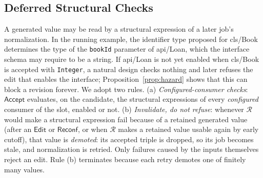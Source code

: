 \documentclass[pdflatex,sn-mathphys-num]{sn-jnl}
\theoremstyle{thmstyleone}%
\theoremstyle{thmstyletwo}%
\theoremstyle{thmstylethree}%
\newcommand{\Acc}{\mathsf{Accept}}
\newcommand{\vw}[1]{\textsf{#1}}
\begin{document}
\subsection{Deferred Structural Checks}\label{sec:deferred}
A generated value may be read by a structural expression of a later job's normalization. In the running example, the identifier type proposed for \vw{cls/Book} determines the type of the \texttt{bookId} parameter of \vw{api/Loan}, which the interface schema may require to be a string. If \vw{api/Loan} is not yet enabled when \vw{cls/Book} is accepted with \texttt{Integer}, a natural design checks nothing and later refuses the edit that enables the interface; Proposition~\ref{prop:hazard} shows that this can block a revision forever. We adopt two rules. (a) \emph{Configured-consumer checks}: $\Acc$ evaluates, on the candidate, the structural expressions of every \emph{configured} consumer of the slot, enabled or not. (b) \emph{Invalidate, do not refuse}: whenever $\mathcal R$ would make a structural expression fail because of a retained generated value (after an $\mathsf{Edit}$ or $\mathsf{Reconf}$, or when $\mathcal R$ makes a retained value usable again by early cutoff), that value is \emph{demoted}: its accepted triple is dropped, so its job becomes stale, and normalization is retried. Only failures caused by the inputs themselves reject an edit. Rule (b) terminates because each retry demotes one of finitely many values.
\end{document}
